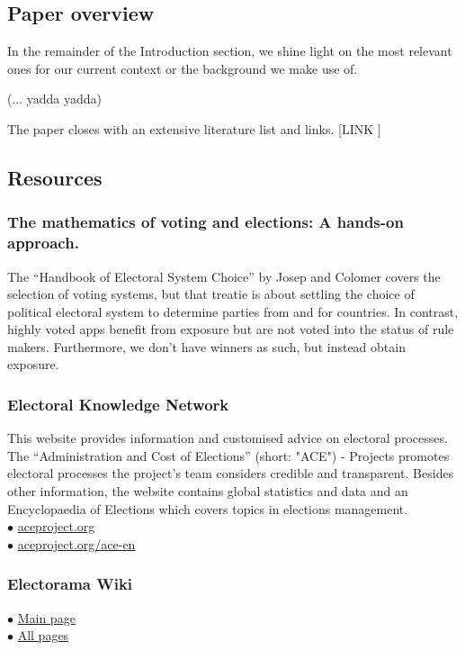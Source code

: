 
\subsection{Paper overview}

In the remainder of the Introduction section, we shine light on the most relevant ones for our current context or the background we make use of.

(... yadda yadda)

The paper closes with an extensive literature list and links. [LINK ]

\subsection{Resources} 

\subsubsection{The mathematics of voting and elections: A hands-on approach.}
The ``Handbook of Electoral System Choice'' by Josep and Colomer covers the selection of voting systems, but that treatie is about settling the choice of political electoral system to determine parties from and for countries. In contrast, highly voted apps benefit from exposure but are not voted into the status of rule makers.
Furthermore, we don't have winners as such, but instead obtain exposure.

\subsubsection{Electoral Knowledge Network}
This website provides information and customised advice on electoral processes. 
The ``Administration and Cost of Elections'' (short: "ACE") - Projects promotes electoral processes the project's team considers credible and transparent. 
Besides other information, the website contains global statistics and data and an Encyclopaedia of Elections which covers topics in elections management. \\
$\bullet$ \href{http://www.aceproject.org/}{aceproject.org}\\
$\bullet$ \href{http://aceproject.org/ace-en}{aceproject.org/ace-en}

\subsubsection{Electorama Wiki} 
$\bullet$ \href{https://wiki.electorama.com}{Main page}\\
$\bullet$ \href{hhttps://wiki.electorama.com/wiki/Special:AllPages}{All pages}

